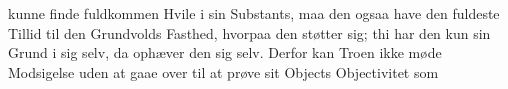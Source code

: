 \documentclass[12pt]{book}
\newcommand{\opage}[1]{\marginnote{\footnotesize\textit{[#1]}}}
\begin{document}
\opage{74} \setcounter{footnote}{0}%
kunne finde fuldkommen Hvile i sin Substants, maa den ogsaa have den fuldeste
Tillid til den Grundvolds Fasthed, hvorpaa den støtter sig; thi har den kun
sin Grund i sig selv, da ophæver den sig selv. Derfor kan Troen ikke møde
Modsigelse uden at gaae over til at prøve sit Objects Objectivitet som
\end{document}
